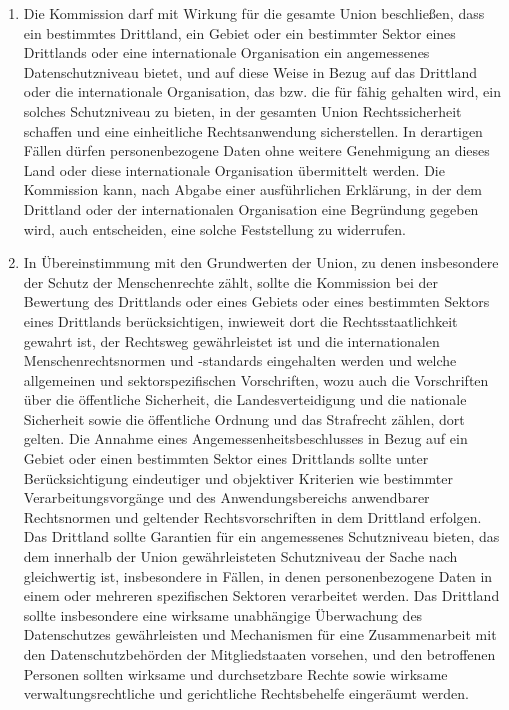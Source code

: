 \begin{enumerate}
   \item Die Kommission darf mit Wirkung für die gesamte Union beschließen, dass ein bestimmtes Drittland, ein Gebiet
    oder ein bestimmter Sektor eines Drittlands oder eine internationale Organisation ein angemessenes
    Datenschutzniveau bietet, und auf diese Weise in Bezug auf das Drittland oder die internationale Organisation, das
    bzw. die für fähig gehalten wird, ein solches Schutzniveau zu bieten, in der gesamten Union Rechtssicherheit
    schaffen und eine einheitliche Rechtsanwendung sicherstellen. In derartigen Fällen dürfen personenbezogene Daten
    ohne weitere Genehmigung an dieses Land oder diese internationale Organisation übermittelt werden. Die Kommission
    kann, nach Abgabe einer ausführlichen Erklärung, in der dem Drittland oder der internationalen Organisation eine
    Begründung gegeben wird, auch entscheiden, eine solche Feststellung zu widerrufen.%
   \label{itm:eg-103}
   

   \item In Übereinstimmung mit den Grundwerten der Union, zu denen insbesondere der Schutz der Menschenrechte zählt,
    sollte die Kommission bei der Bewertung des Drittlands oder eines Gebiets oder eines bestimmten Sektors eines
    Drittlands berücksichtigen, inwieweit dort die Rechtsstaatlichkeit gewahrt ist, der Rechtsweg gewährleistet ist und
    die internationalen Menschenrechtsnormen und -standards eingehalten werden und welche allgemeinen und
    sektorspezifischen Vorschriften, wozu auch die Vorschriften über die öffentliche Sicherheit, die Landesverteidigung
    und die nationale Sicherheit sowie die öffentliche Ordnung und das Strafrecht zählen, dort gelten. Die Annahme
    eines Angemessenheitsbeschlusses in Bezug auf ein Gebiet oder einen bestimmten Sektor eines Drittlands sollte unter
    Berücksichtigung eindeutiger und objektiver Kriterien wie bestimmter Verarbeitungsvorgänge und des
    Anwendungsbereichs anwendbarer Rechtsnormen und geltender Rechtsvorschriften in dem Drittland erfolgen. Das
    Drittland sollte Garantien für ein angemessenes Schutzniveau bieten, das dem innerhalb der Union gewährleisteten
    Schutzniveau der Sache nach gleichwertig ist, insbesondere in Fällen, in denen personenbezogene Daten in einem oder
    mehreren spezifischen Sektoren verarbeitet werden. Das Drittland sollte insbesondere eine wirksame unabhängige
    Überwachung des Datenschutzes gewährleisten und Mechanismen für eine Zusammenarbeit mit den Datenschutzbehörden der
    Mitgliedstaaten vorsehen, und den betroffenen Personen sollten wirksame und durchsetzbare Rechte sowie wirksame
    verwaltungsrechtliche und gerichtliche Rechtsbehelfe eingeräumt werden.%
   \label{itm:eg-104}
   

\end{enumerate}
